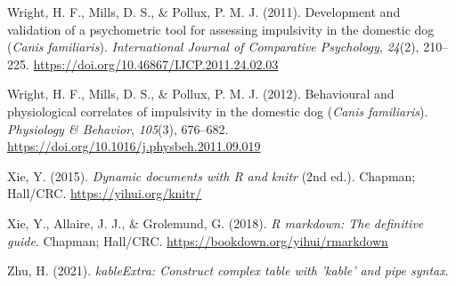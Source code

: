 \documentclass[
  ,pub,floatsintext]{apa6}
\newlength{\cslhangindent}
\newlength{\cslentryspacingunit} %
\newenvironment{CSLReferences}[2] %
 {%
  \setlength{\parindent}{0pt}
  \ifodd #1
  \let\oldpar\par
  \def\par{\hangindent=\cslhangindent\oldpar}
  \fi
  \setlength{\parskip}{#2\cslentryspacingunit}
 }%
 {}
\begin{document}
\begin{CSLReferences}{1}{0}
\leavevmode{}%
Wright, H. F., Mills, D. S., \& Pollux, P. M. J. (2011). Development and validation of a psychometric tool for assessing impulsivity in the domestic dog ({\emph{Canis}}{ \emph{familiaris}}). \emph{International Journal of Comparative Psychology}, \emph{24}(2), 210--225. \url{https://doi.org/10.46867/IJCP.2011.24.02.03}

\leavevmode{}%
Wright, H. F., Mills, D. S., \& Pollux, P. M. J. (2012). Behavioural and physiological correlates of impulsivity in the domestic dog ({\emph{Canis}}{ \emph{familiaris}}). \emph{Physiology \& Behavior}, \emph{105}(3), 676--682. \url{https://doi.org/10.1016/j.physbeh.2011.09.019}

\leavevmode{}%
Xie, Y. (2015). \emph{Dynamic documents with {R} and knitr} (2nd ed.). Chapman; Hall/CRC. \url{https://yihui.org/knitr/}

\leavevmode{}%
Xie, Y., Allaire, J. J., \& Grolemund, G. (2018). \emph{R markdown: The definitive guide}. Chapman; Hall/CRC. \url{https://bookdown.org/yihui/rmarkdown}

\leavevmode{}%
Zhu, H. (2021). \emph{kableExtra: Construct complex table with 'kable' and pipe syntax}.

\end{CSLReferences}
\end{document}
